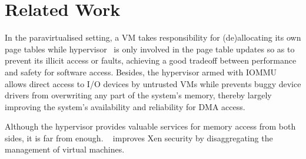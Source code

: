 \section{Related Work} \label{sec:rel}
In the paravirtualised setting, a VM takes responsibility for (de)allocating its own page tables while hypervisor~\cite{x86-pv-model,barham2003xen,pratt2005xen,chisnall2008definitive} is only involved in the page table updates so as to prevent its illicit access or faults, achieving a good tradeoff between performance and safety for software access.
Besides, the hypervisor armed with IOMMU~\cite{ben2008xen,intelvt,amdvt} allows direct access to I/O devices by untrusted VMs while prevents buggy device drivers from overwriting any part of the system's memory, thereby largely improving the system's availability and reliability for DMA access.

Although the hypervisor provides valuable services for memory access from both sides, it is far from enough.
~\cite{disaggregation} improves Xen security by disaggregating the management of virtual machines. ~\cite{amit2012iommu,malka2015riommu}
~\cite{IOTLB-bottleneck,}
